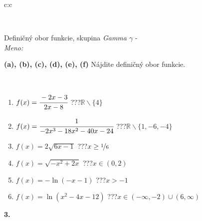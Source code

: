 \documentclass[10pt]{report}
\begin{document}
\begin{tabular}{c:c}
\begin{minipage}[c][104.5mm][t]{0.5\linewidth}
\begin{center}
\begin{minipage}{0.20\linewidth}
\begin{center}
\end{center}
\end{minipage}
\end{center}
\end{minipage}
\\ \hdashline
\begin{minipage}[c][104.5mm][t]{0.5\linewidth}
\begin{center}
\vspace{7mm}
{\huge Definičný obor funkcie, skupina \textit{Gamma $\gamma$} -}\\[5mm]
\textit{Meno:}\phantom{xxxxxxxxxxxxxxxxxxxxxxxxxxxxxxxxxxxxxxxxxxxxxxxxxxxxxxxxxxxxxxxxx}\\[5mm]
\begin{minipage}{0.95\linewidth}
\begin{center}
{
\textbf{(a), (b), (c), (d), (e), (f)} Nájdite definičný obor funkcie. \\[1mm]
\phantom{x}
}
\end{center}
\end{minipage}
\\[4mm]
\begin{minipage}{0.79\linewidth}
\begin{center}
\begin{varwidth}{\linewidth}
\begin{enumerate}
\normalsizerrr
\item $f(x)=\cfrac{-2x-3}{2x-8}$\quad \dotfill\; ???\;\dotfill \quad $ \mathbb{R} \smallsetminus\{4 \}$
\item $f(x)=\cfrac{1}{-2x^3-18x^2-40x-24}$\quad \dotfill\; ???\;\dotfill \quad $ \mathbb{R} \smallsetminus\{1,-6,-4 \}$
\item $f(x)=2\sqrt{6x-1}$\quad \dotfill\; ???\;\dotfill \quad $x\geq\nicefrac{1}{6}$
\item $f(x)=\sqrt{-x^2+2x}$\quad \dotfill\; ???\;\dotfill \quad $x\in(0 , 2)$
\item $f(x)=-\ln{(-x-1)}$\quad \dotfill\; ???\;\dotfill \quad $x>-1$
\item $f(x)=\ln{(x^2-4x-12)}$\quad \dotfill\; ???\;\dotfill \quad $x\in(-\infty , -2)\cup(6 , \infty)$
\end{enumerate}
\end{varwidth}
\end{center}
\end{minipage}
\begin{minipage}{0.20\linewidth}
\begin{center}
{\Huge\bfseries 3.} \\[2mm]

\end{center}
\end{minipage}
\end{center}
\end{minipage}
\end{tabular}
\end{document}
